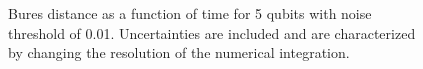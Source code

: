 \pagebreak

\begin{figure}[h]
\begin{center}
\end{center}
\caption{Bures distance as a function of time for 5 qubits with noise
threshold of 0.01.  Uncertainties are included and are characterized 
by changing the resolution of the numerical integration.}
\end{figure}

